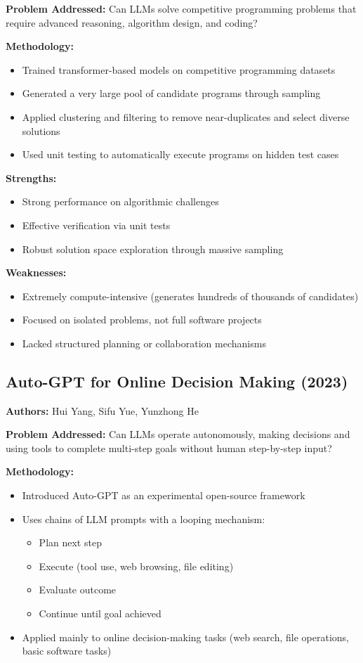 \textbf{Problem Addressed:} Can LLMs solve competitive programming problems that require advanced reasoning, algorithm design, and coding?

\textbf{Methodology:}
\begin{itemize}
    \item Trained transformer-based models on competitive programming datasets
    \item Generated a very large pool of candidate programs through sampling
    \item Applied clustering and filtering to remove near-duplicates and select diverse solutions
    \item Used unit testing to automatically execute programs on hidden test cases
\end{itemize}

\textbf{Strengths:}
\begin{itemize}
    \item Strong performance on algorithmic challenges
    \item Effective verification via unit tests
    \item Robust solution space exploration through massive sampling
\end{itemize}

\textbf{Weaknesses:}
\begin{itemize}
    \item Extremely compute-intensive (generates hundreds of thousands of candidates)
    \item Focused on isolated problems, not full software projects
    \item Lacked structured planning or collaboration mechanisms
\end{itemize}

\subsection{Auto-GPT for Online Decision Making (2023)}
\textbf{Authors:} Hui Yang, Sifu Yue, Yunzhong He

\textbf{Problem Addressed:} Can LLMs operate autonomously, making decisions and using tools to complete multi-step goals without human step-by-step input?

\textbf{Methodology:}
\begin{itemize}
    \item Introduced Auto-GPT as an experimental open-source framework
    \item Uses chains of LLM prompts with a looping mechanism:
    \begin{itemize}
        \item Plan next step
        \item Execute (tool use, web browsing, file editing)
        \item Evaluate outcome
        \item Continue until goal achieved
    \end{itemize}
    \item Applied mainly to online decision-making tasks (web search, file operations, basic software tasks)
\end{itemize}

